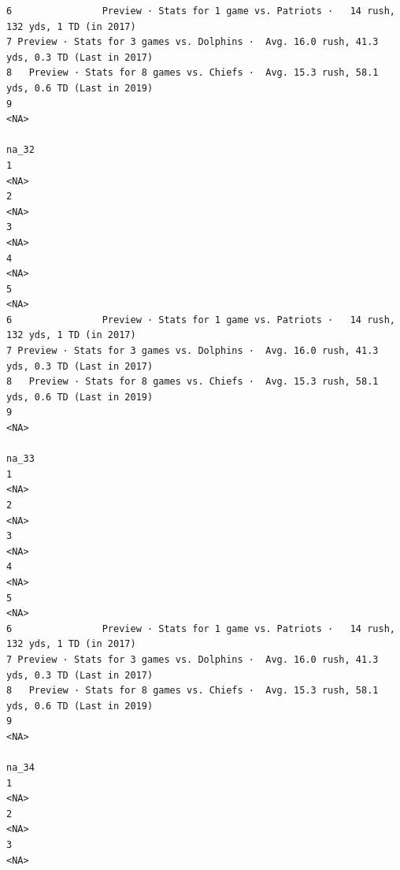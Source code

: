 \documentclass[
]{article}
\begin{document}
\begin{verbatim}
6                Preview · Stats for 1 game vs. Patriots ·   14 rush, 132 yds, 1 TD (in 2017)
7 Preview · Stats for 3 games vs. Dolphins ·  Avg. 16.0 rush, 41.3 yds, 0.3 TD (Last in 2017)
8   Preview · Stats for 8 games vs. Chiefs ·  Avg. 15.3 rush, 58.1 yds, 0.6 TD (Last in 2019)
9                                                                                        <NA>
                                                                                        na_32
1                                                                                        <NA>
2                                                                                        <NA>
3                                                                                        <NA>
4                                                                                        <NA>
5                                                                                        <NA>
6                Preview · Stats for 1 game vs. Patriots ·   14 rush, 132 yds, 1 TD (in 2017)
7 Preview · Stats for 3 games vs. Dolphins ·  Avg. 16.0 rush, 41.3 yds, 0.3 TD (Last in 2017)
8   Preview · Stats for 8 games vs. Chiefs ·  Avg. 15.3 rush, 58.1 yds, 0.6 TD (Last in 2019)
9                                                                                        <NA>
                                                                                        na_33
1                                                                                        <NA>
2                                                                                        <NA>
3                                                                                        <NA>
4                                                                                        <NA>
5                                                                                        <NA>
6                Preview · Stats for 1 game vs. Patriots ·   14 rush, 132 yds, 1 TD (in 2017)
7 Preview · Stats for 3 games vs. Dolphins ·  Avg. 16.0 rush, 41.3 yds, 0.3 TD (Last in 2017)
8   Preview · Stats for 8 games vs. Chiefs ·  Avg. 15.3 rush, 58.1 yds, 0.6 TD (Last in 2019)
9                                                                                        <NA>
                                                                                        na_34
1                                                                                        <NA>
2                                                                                        <NA>
3                                                                                        <NA>

\end{verbatim}
\end{document}
